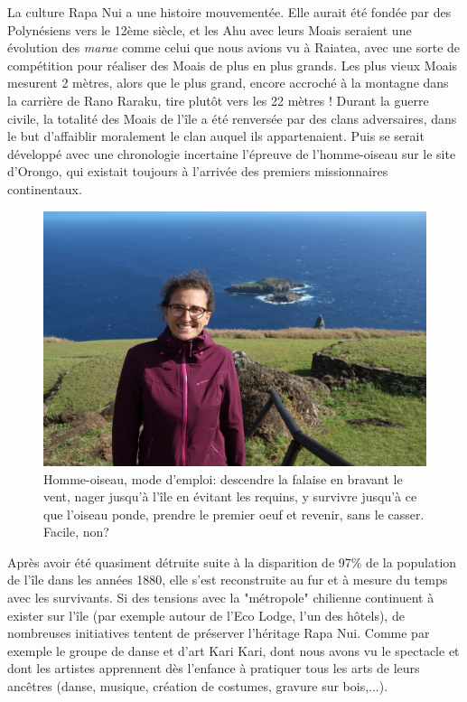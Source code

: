 La culture Rapa Nui a une histoire mouvementée. Elle aurait été fondée
par des Polynésiens vers le 12ème siècle, et les Ahu avec leurs Moais
seraient une évolution des \emph{marae} comme celui que nous avions vu à
Raiatea, avec une sorte de compétition pour réaliser des Moais de plus
en plus grands. Les plus vieux Moais mesurent 2 mètres, alors que le
plus grand, encore accroché à la montagne dans la carrière de Rano
Raraku, tire plutôt vers les 22 mètres ! Durant la guerre civile, la
totalité des Moais de l'île a été renversée par des clans adversaires,
dans le but d'affaiblir moralement le clan auquel ils appartenaient.
Puis se serait développé avec une chronologie incertaine l'épreuve de
l'homme-oiseau sur le site d'Orongo, qui existait toujours à l'arrivée
des premiers missionnaires continentaux.

\begin{figure}
\centering
\includegraphics{images/20180827_birdman.JPG}
\caption{Homme-oiseau, mode d'emploi: descendre la falaise en bravant le
vent, nager jusqu'à l'île en évitant les requins, y survivre jusqu'à ce
que l'oiseau ponde, prendre le premier oeuf et revenir, sans le casser.
Facile, non?}
\end{figure}

Après avoir été quasiment détruite suite à la disparition de 97\% de la
population de l'île dans les années 1880, elle s'est reconstruite au fur
et à mesure du temps avec les survivants. Si des tensions avec la
"métropole" chilienne continuent à exister sur l'île (par exemple autour
de l'Eco Lodge, l'un des hôtels), de nombreuses initiatives tentent de
préserver l'héritage Rapa Nui. Comme par exemple le groupe de danse et
d'art Kari Kari, dont nous avons vu le spectacle et dont les artistes
apprennent dès l'enfance à pratiquer tous les arts de leurs ancêtres
(danse, musique, création de costumes, gravure sur bois,...).

